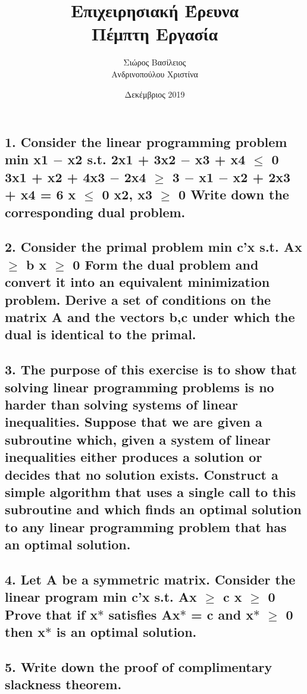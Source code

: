 \documentclass[12pt]{article}
\title{\hugeΑλγοριθμική Επιχειρησιακή Έρευνα\\Πέμπτη Εργασία}
\author{Σιώρος Βασίλειος\\Ανδρινοπούλου Χριστίνα}
\date{Δεκέμβριος 2019}
\begin{document}
\maketitle


\pagebreak


\subsection*{1. Consider the linear programming problem
min x1 \ensuremath{-} x2
s.t. 2x1 + 3x2 \ensuremath{-} x3 + x4 \ensuremath{\leq} 0
3x1 + x2 + 4x3 \ensuremath{-} 2x4 \ensuremath{\geq} 3
\ensuremath{-} x1 \ensuremath{-} x2 + 2x3 + x4 = 6
x \ensuremath{\leq} 0
x2, x3 \ensuremath{\geq} 0
Write down the corresponding dual problem.}

\vspace{2in}

\pagebreak

\subsection*{2. Consider the primal problem
min c'x
s.t. Ax \ensuremath{\geq} b
x \ensuremath{\geq} 0
Form the dual problem and convert it into an equivalent minimization problem. Derive a set of
conditions on the matrix A and the vectors b,c under which the dual is identical to the primal.}

\vspace{2in}

\pagebreak

\subsection*{3. The purpose of this exercise is to show that solving linear programming
problems is no harder than solving systems of linear inequalities. Suppose that we are given
a subroutine which, given a system of linear inequalities either produces a solution or decides
that no solution exists. Construct a simple algorithm that uses a single call to this subroutine
and which finds an optimal solution to any linear programming problem that has an optimal
solution.}

\vspace{2in}

\pagebreak

\subsection*{4. Let A be a symmetric matrix. Consider the linear program
min c'x
s.t. Ax \ensuremath{\geq} c
x \ensuremath{\geq} 0
Prove that if x\ensuremath{*} satisfies Ax\ensuremath{*} = c and x\ensuremath{*} \ensuremath{\geq} 0 then x\ensuremath{*} is an optimal solution.}

\vspace{2in}

\pagebreak

\subsection*{5. Write down the proof of complimentary slackness theorem.}

\vspace{2in}

\pagebreak
\end{document}
